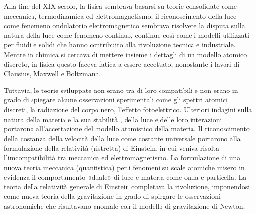 \documentclass[letterpaper,10pt,italian]{jupyterBook}
\begin{document}
\sphinxAtStartPar
Alla fine del XIX secolo, la fisica sembrava basarsi su teorie consolidate come meccanica, termodinamica ed elettromagnetismo; il riconoscimento della luce come fenomeno ondulatorio elettromagnetico sembrava risolvere la disputa sulla natura della luce come fenomeno continuo, continuo così come i modelli utilizzati per fluidi e solidi che hanno contribuito alla rivoluzione tecnica e industriale. Mentre in chimica si cercava di mettere insieme i dettagli di un modello atomico discreto, in fisica questo faceva fatica a essere accettato, nonostante i lavori di Clausius, Maxwell e Boltzmann.

\sphinxAtStartPar
Tuttavia, le teorie sviluppate non erano tra di loro compatibili e non erano in grado di spiegare alcune osservazioni sperimentali come gli spettri atomici discreti, la radiazione del corpo nero, l’effetto fotoelettrico. Ulteriori indagini sulla natura della materia \sphinxhyphen{} e la sua stabilità \sphinxhyphen{}, della luce e delle loro interazioni portarono all’accettazione del modello atomistico della materia.
Il riconoscimento della costanza della velocità della luce come costante universale portarono alla formulazione della relatività (ristretta) di Einstein, in cui veniva risolta l’imcompatibilità tra meccanica ed elettromagnetismo. La formulazione di una nuova teoria meccanica (quantistica) per i fenomeni su scale atomiche misero in evidenza il comportamento «duale» di luce e materia come onda e particella.
La teoria della relatività generale di Einstein completava la rivoluzione, imponendosi come nuova teoria della gravitazione in grado di spiegare le osservazioni astronomiche che risultavano anomale con il modello di gravitazione di Newton.





\sphinxstepscope
\end{document}
